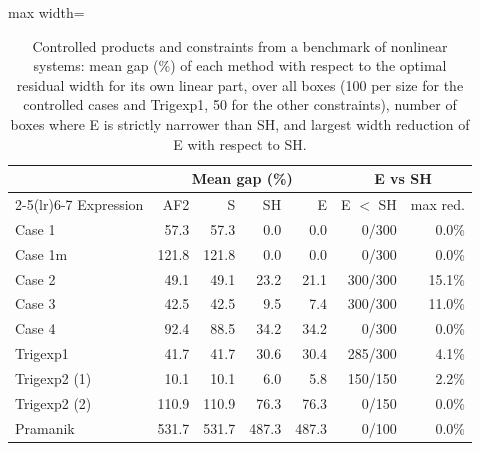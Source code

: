 \begin{table}[H]
\centering
\caption{Controlled products and constraints from a benchmark of nonlinear systems: mean gap (\%) of each method with respect to the optimal residual width for its own linear part, over all boxes (100 per size for the controlled cases and Trigexp1, 50 for the other constraints), number of boxes where E is strictly narrower than SH, and largest width reduction of E with respect to SH.}
\label{tab:expressions}
\small
\setlength{\tabcolsep}{4pt}
\begin{adjustbox}{max width=\linewidth}\begin{tabular}{lrrrrrr}
\toprule
 & \multicolumn{4}{c}{Mean gap (\%)} & \multicolumn{2}{c}{E vs SH} \\
\cmidrule(lr){2-5}\cmidrule(lr){6-7}
Expression & AF2 & S & SH & E & E $<$ SH & max red. \\
\midrule
Case 1 & 57.3 & 57.3 & 0.0 & 0.0 & 0/300 & 0.0\% \\
Case 1m & 121.8 & 121.8 & 0.0 & 0.0 & 0/300 & 0.0\% \\
Case 2 & 49.1 & 49.1 & 23.2 & 21.1 & 300/300 & 15.1\% \\
Case 3 & 42.5 & 42.5 & 9.5 & 7.4 & 300/300 & 11.0\% \\
Case 4 & 92.4 & 88.5 & 34.2 & 34.2 & 0/300 & 0.0\% \\
\midrule
Trigexp1 & 41.7 & 41.7 & 30.6 & 30.4 & 285/300 & 4.1\% \\
Trigexp2 (1) & 10.1 & 10.1 & 6.0 & 5.8 & 150/150 & 2.2\% \\
Trigexp2 (2) & 110.9 & 110.9 & 76.3 & 76.3 & 0/150 & 0.0\% \\
Pramanik & 531.7 & 531.7 & 487.3 & 487.3 & 0/100 & 0.0\% \\
\bottomrule
\end{tabular}\end{adjustbox}
\end{table}